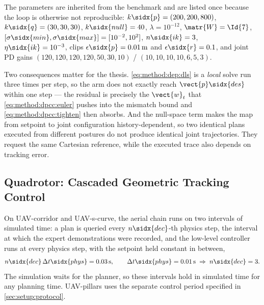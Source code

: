 The parameters are inherited from the benchmark and are listed once because the loop is otherwise
not reproducible: $k\sidx{p} = (200,200,800)$, $k\sidx{q} = (30,30,30)$, $k\sidx{null} = 40$,
$\lambda = 10^{-12}$, $\matr{W} = \Id{7}$, $[\sigma\sidx{min},\sigma\sidx{max}] = [10^{-2},10^{2}]$,
$n\sidx{ik} = 3$, $\eta\sidx{ik} = 10^{-3}$, clips $\epsilon\sidx{p} = 0.01\,\textrm{m}$ and
$\epsilon\sidx{r} = 0.1$, and joint PD gains
$(120,120,120,120,50,30,10)$ / $(10,10,10,10,6,5,3)$.

Two consequences matter for the thesis. \eqref{eq:method:dep:dls} is a \emph{local} solve run three
times per step, so the arm does not exactly reach $\vect{p}\sidx{des}$ within one step --- the residual
is precisely the $\vect{w}_{t}$ that \eqref{eq:method:dpcc:euler} pushes into the mismatch bound and
\eqref{eq:method:dpcc:tighten} then absorbs. And the null-space term makes the map from setpoint to
joint configuration history-dependent, so two identical plans executed from different postures do not
produce identical joint trajectories. They request the same Cartesian reference, while the executed
trace also depends on tracking error.

\subsection{Quadrotor: Cascaded Geometric Tracking Control}\label{sec:method:geometric}

On UAV-corridor and UAV-s-curve, the aerial chain runs on two intervals of simulated time: a plan is queried every $n\sidx{dec}$-th physics step, the interval at which the expert
demonstrations were recorded, and the low-level controller runs at every physics step, with the
setpoint held constant in between,
\begin{equation}\label{eq:method:dep:multirate}
  n\sidx{dec}\,\Delta t\sidx{phys} = 0.03\,\textrm{s},
  \qquad
  \Delta t\sidx{phys} = 0.01\,\textrm{s}
  \;\Rightarrow\; n\sidx{dec} = 3 .
\end{equation}
The simulation waits for the planner, so these intervals hold in simulated time for any planning
time. UAV-pillars uses the separate control period specified in \autoref{sec:setup:protocol}.

